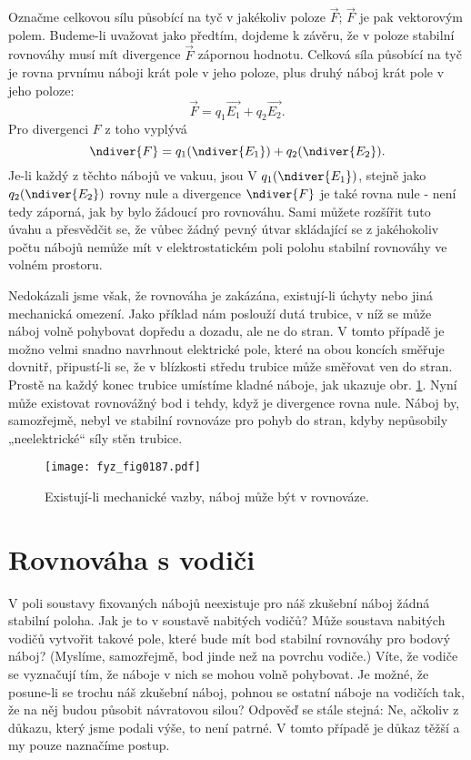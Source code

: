   Označme celkovou sílu působící na tyč v jakékoliv poloze \(\vec{F}\); \(\vec{F}\) je pak
  vektorovým polem. Budeme-li uvažovat jako předtím, dojdeme k závěru, že v poloze stabilní
  rovnováhy musí mít divergence \(\vec{F}\) zápornou hodnotu. Celková síla působící na tyč je rovna
  prvnímu náboji krát pole v jeho poloze, plus druhý náboj krát pole v jeho poloze: 
  \begin{equation}\label{fyz:eq_fey_elstat_gauss01}
   \vec{F}=q_1\vec{E_1} + q_2\vec{E_2}. 
  \end{equation}
  Pro divergenci \(F\) z toho vyplývá \[\ndiver{F}=q_1(\ndiver{E_1}) + q_2(\ndiver{E_2}).\] Je-li
  každý z těchto nábojů ve vakuu, jsou V \(q_1(\ndiver{E_1})\), stejně jako \(q_2(\ndiver{E_2})\)
  rovny nule a divergence \(\ndiver{F}\) je také rovna nule - není tedy záporná, jak by bylo žádoucí
  pro rovnováhu. Sami můžete rozšířit tuto úvahu a přesvědčit se, že vůbec žádný pevný útvar
  skládající se z jakéhokoliv počtu nábojů nemůže mít v elektrostatickém poli polohu stabilní
  rovnováhy ve volném prostoru.
  
  Nedokázali jsme však, že rovnováha je zakázána, existují-li úchyty nebo jiná mechanická omezení.
  Jako příklad nám poslouží dutá trubice, v níž se může náboj volně pohybovat dopředu a dozadu, ale
  ne do stran. V tomto případě je možno velmi snadno navrhnout elektrické pole, které na obou
  koncích směřuje dovnitř, připustí-li se, že v blízkosti středu trubice může směřovat ven do stran.
  Prostě na každý konec trubice umístíme kladné náboje, jak ukazuje obr. \ref{fyz:fig0187}. Nyní může
  existovat rovnovážný bod i tehdy, když je divergence rovna nule. Náboj by, samozřejmě, nebyl ve
  stabilní rovnováze pro pohyb do stran, kdyby nepůsobily „neelektrické“ síly stěn trubice. 
  
  \begin{figure}[ht!] %
    \centering
    \texttt{[image: fyz\_fig0187.pdf]}
    \caption{Existují-li mechanické vazby, náboj může být v rovnováze.}
    \label{fyz:fig0187}
  \end{figure}      
  
\section{Rovnováha s vodiči}\label{fyz:IIchapVsecII}
  V poli soustavy fixovaných nábojů neexistuje pro náš zkušební náboj žádná stabilní poloha. Jak je
  to v soustavě nabitých vodičů? Může soustava nabitých vodičů vytvořit takové pole, které bude mít
  bod stabilní rovnováhy pro bodový náboj? (Myslíme, samozřejmě, bod jinde než na povrchu vodiče.)
  Víte, že vodiče se vyznačují tím, že náboje v nich se mohou volně pohybovat. Je možné, že
  posune-li se trochu náš zkušební náboj, pohnou se ostatní náboje na vodičích tak, že na něj budou
  působit návratovou silou? Odpověď se stále stejná: Ne, ačkoliv z důkazu, který jsme podali výše,
  to není patrné. V tomto případě je důkaz těžší a my pouze naznačíme postup.
  
